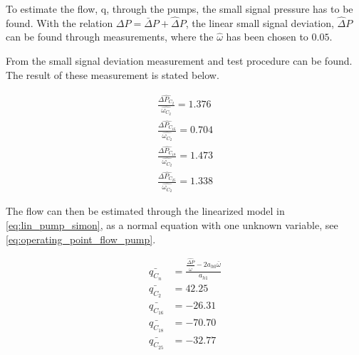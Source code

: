 To estimate the flow, q, through the pumps, the small signal pressure has to be found. With the relation $\Delta P = \bar{\Delta} P + \hat{\Delta} P$, the linear small signal deviation, $\hat{\Delta} P$ can be found through measurements, where the $\hat{\omega}$ has been chosen to $0.05$.  

From  the small signal deviation measurement and test procedure can be found. The result of these measurement is stated below.

\begin{equation*}
	\begin{split}
	\frac{\hat{\Delta P_{C_2}}}{\hat{\omega_{C_2}}} = 1.376   \\
	\frac{\hat{\Delta P_{C_16}}}{\hat{\omega_{C_2}}} =  0.704 \\
	\frac{\hat{\Delta P_{C_18}}}{\hat{\omega_{C_2}}} =  1.473 \\
	\frac{\hat{\Delta P_{C_25}}}{\hat{\omega_{C_2}}} = 1.338
	\end{split}	
\end{equation*}

The flow can then be estimated through the linearized model in \eqref{eq:lin_pump_simon}, as a normal equation with one unknown variable, see \eqref{eq:operating_point_flow_pump}.

\begin{equation}
	\begin{split}
	\bar{q_{C_{n}}}  &= \frac{\frac{\hat{\Delta P}}{\hat{\omega} }-2a_{h0}\bar{\omega}}{a_{h1}}\\
	\bar{q_{C_{2}}} &= 42.25\\
	\bar{q_{C_{16}}} &= -26.31\\
	\bar{q_{C_{18}}} &= -70.70\\
	\bar{q_{C_{25}}} &= -32.77
	\end{split}
	\label{eq:operating_point_flow_pump}
\end{equation}







